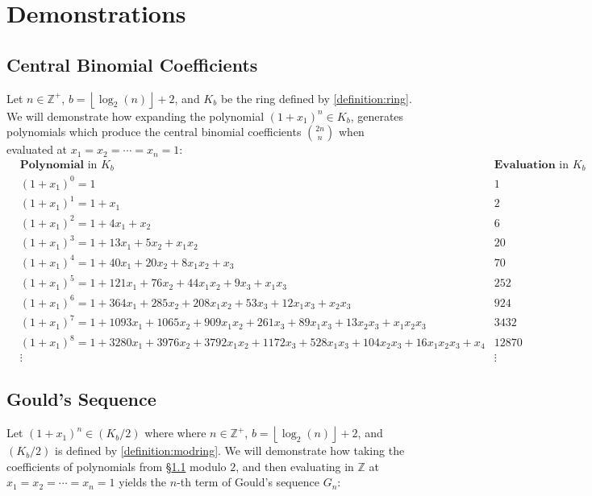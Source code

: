 \documentclass{article}
\theoremstyle{plain}
\theoremstyle{definition}
\newcommand{\floor}[1]{\left\lfloor #1 \right\rfloor}
\newcommand{\Z}{\mathbb{Z}}
\newcommand{\K}{K}
\begin{document}
\section{Demonstrations}

\subsection{Central Binomial Coefficients} \label{section:demonstrations:cbc}
Let $n \in \Z^+$, $b={\floor{\log_2(n)}+2}$, and $\K_b$ be the ring defined by \cref{definition:ring}. We will demonstrate how expanding the polynomial $(1+x_1)^n \in \K_b$, generates polynomials which produce the central binomial coefficients $\binom{2n}{n}$ when evaluated at $x_1=x_2=\cdots=x_n=1$:
\small
\begin{align*}
& \textbf{Polynomial} \text{ in } \K_b & \textbf{Evaluation} \text{ in } \K_b \\ 
& (1+x_1)^0 = 1 & 1 \\
& (1+x_1)^1 = 1+x_1 & 2 \\
& (1+x_1)^2 = 1+4x_1+x_2 & 6 \\
& (1+x_1)^3 = 1+13x_1+5x_2+x_1x_2 & 20 \\
& (1+x_1)^4 = 1+40x_1+20x_2+8x_1x_2+x_3 & 70 \\
& (1+x_1)^5 = 1+121x_1+76x_2+44x_1x_2+9x_3+x_1x_3 & 252 \\
& (1+x_1)^6 = 1+364x_1+285x_2+208x_1x_2+53x_3+12x_1x_3+x_2x_3 & 924 \\
& (1+x_1)^7 = 1+1093x_1+1065x_2+909x_1x_2+261x_3+89x_1x_3+13x_2x_3+x_1x_2x_3 & 3432 \\
& (1+x_1)^8 = 1+3280x_1+3976x_2+3792x_1x_2+1172x_3+528x_1x_3+104x_2x_3+16x_1x_2x_3+x_4 & 12870 \\
& \vdots & \vdots
\end{align*}
\normalsize

\subsection{Gould's Sequence} \label{section:demonstrations:goulds}
Let $(1+x_1)^n \in (\K_b/2)$ where where $n \in \Z^+$, $b={\floor{\log_2(n)}+2}$, and $(\K_b/2)$ is defined by \cref{definition:modring}. We will demonstrate how taking the coefficients of polynomials from \S\ref{section:demonstrations:cbc} modulo $2$, and then evaluating in $\Z$ at $x_1=x_2=\cdots=x_n=1$ yields the $n$-th term of Gould's sequence $G_n$:
\end{document}
